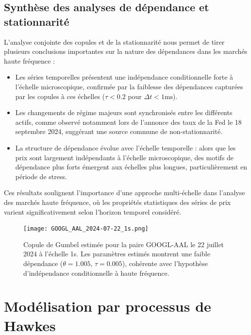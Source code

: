 \documentclass[10pt,a4paper]{article}
\theoremstyle{definition}
\theoremstyle{remark}
\begin{document}
\begin{itemize}
\subsection{Synthèse des analyses de dépendance et stationnarité}

L'analyse conjointe des copules et de la stationnarité nous permet de tirer plusieurs conclusions importantes sur la nature des dépendances dans les marchés haute fréquence :

\begin{itemize}
    \item Les séries temporelles présentent une indépendance conditionnelle forte à l'échelle microscopique, confirmée par la faiblesse des dépendances capturées par les copules à ces échelles ($\tau < 0.2$ pour $\Delta t < 1\text{ms}$).
    
    \item Les changements de régime majeurs sont synchronisés entre les différents actifs, comme observé notamment lors de l'annonce des taux de la Fed le 18 septembre 2024, suggérant une source commune de non-stationnarité.
    
    \item La structure de dépendance évolue avec l'échelle temporelle : alors que les prix sont largement indépendants à l'échelle microscopique, des motifs de dépendance plus forts émergent aux échelles plus longues, particulièrement en période de stress.
\end{itemize}

Ces résultats soulignent l'importance d'une approche multi-échelle dans l'analyse des marchés haute fréquence, où les propriétés statistiques des séries de prix varient significativement selon l'horizon temporel considéré.

\begin{figure}[h!]
\centering
    \texttt{[image: GOOGL\_AAL\_2024-07-22\_1s.png]}
    \caption{Copule de Gumbel estimée pour la paire GOOGL-AAL le 22 juillet 2024 à l'échelle 1s. Les paramètres estimés montrent une faible dépendance ($\theta = 1.005$, $\tau = 0.005$), cohérente avec l'hypothèse d'indépendance conditionnelle à haute fréquence.}
    \label{fig:copula_example}
\end{figure}




\newpage
\section{Modélisation par processus de Hawkes}


\end{itemize}
\end{document}
